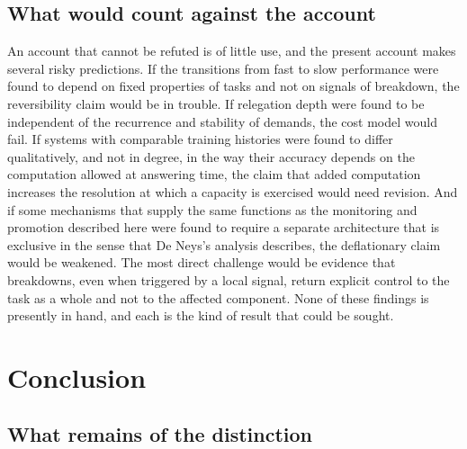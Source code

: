 \documentclass[11pt]{report}
\theoremstyle{remark}
\theoremstyle{definition}
\begin{document}
\section{What would count against the account}

An account that cannot be refuted is of little use, and the present account makes several risky predictions. If the transitions from fast to slow performance were found to depend on fixed properties of tasks and not on signals of breakdown, the reversibility claim would be in trouble. If relegation depth were found to be independent of the recurrence and stability of demands, the cost model would fail. If systems with comparable training histories were found to differ qualitatively, and not in degree, in the way their accuracy depends on the computation allowed at answering time, the claim that added computation increases the resolution at which a capacity is exercised would need revision. And if some mechanisms that supply the same functions as the monitoring and promotion described here were found to require a separate architecture that is exclusive in the sense that De Neys's analysis describes, the deflationary claim would be weakened. The most direct challenge would be evidence that breakdowns, even when triggered by a local signal, return explicit control to the task as a whole and not to the affected component. None of these findings is presently in hand, and each is the kind of result that could be sought.

\chapter{Conclusion}

\section{What remains of the distinction}
\end{document}
